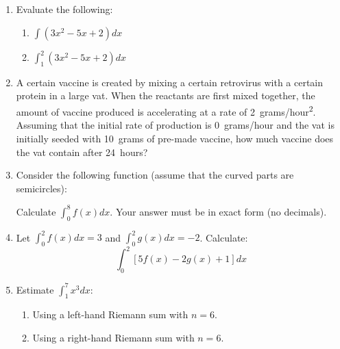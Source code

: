 \documentclass[letterpaper,12pt,fleqn]{article}
\begin{document}
\begin{enumerate}[left=0pt,itemsep=0.5in]

\item Evaluate the following:
  \begin{enumerate}
  \item \(\displaystyle\int (3x^2-5x+2)dx\)
  \item \(\displaystyle\int_1^2 (3x^2-5x+2)dx\)
  \end{enumerate}

\item A certain vaccine is created by mixing a certain retrovirus with a certain protein in a large vat.  When the
  reactants are first mixed together, the amount of vaccine produced is accelerating at a rate of
  \SI{2}{grams/hour^2}.  Assuming that the initial rate of production is \SI{0}{grams/hour} and the vat is
  initially seeded with \SI{10}{grams} of pre-made vaccine, how much vaccine does the vat contain after
  \SI{24}{hours}?

  \newpage

\item Consider the following function (assume that the curved parts are semicircles):
  \begin{center}
  \end{center}
  Calculate \(\displaystyle\int_0^8f(x)dx\).  Your answer must be in exact form (no decimals).

\item Let \(\int_0^2f(x)dx=3\) and \(\int_0^2g(x)dx=-2\).  Calculate:
  \[\int_0^2[5f(x)-2g(x)+1]dx\]

\item Estimate \(\int_1^7x^3dx\):
  \begin{enumerate}
  \item Using a left-hand Riemann sum with \(n=6\).
  \item Using a right-hand Riemann sum with \(n=6\).
  \end{enumerate}


\end{enumerate}
\end{document}

